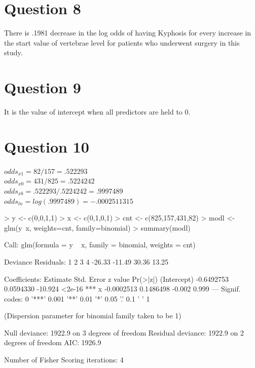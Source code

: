 \documentclass{article}
\begin{document}
\section*{Question 8}
There is .1981 decrease in the log odds of having Kyphosis for every increase in the start value of vertebrae level for patients who underwent surgery in this study. 

\section*{Question 9}
It is the value of intercept when all predictors are held to 0.

\section*{Question 10}
$ odds_{x1} = 82/157 = .522293$ ~\\
$ odds_{x0} = 431/825 = .5224242$ ~\\
$ odds_{xb} = .522293/.5224242 = .9997489$ ~\\
$ odds_{ln} = log(.9997489) =  -.0002511315$ ~\\

\begin{Schunk}
\begin{Sinput}
> y <- c(0,0,1,1)
> x <- c(0,1,0,1)
> cnt <- c(825,157,431,82)
> modl <- glm(y~x, weights=cnt, family=binomial)
> summary(modl)
\end{Sinput}
\begin{Soutput}
Call:
glm(formula = y ~ x, family = binomial, weights = cnt)

Deviance Residuals: 
     1       2       3       4  
-26.33  -11.49   30.36   13.25  

Coefficients:
              Estimate Std. Error z value Pr(>|z|)    
(Intercept) -0.6492753  0.0594330 -10.924   <2e-16 ***
x           -0.0002513  0.1486498  -0.002    0.999    
---
Signif. codes:  0 '***' 0.001 '**' 0.01 '*' 0.05 '.' 0.1 ' ' 1

(Dispersion parameter for binomial family taken to be 1)

    Null deviance: 1922.9  on 3  degrees of freedom
Residual deviance: 1922.9  on 2  degrees of freedom
AIC: 1926.9

Number of Fisher Scoring iterations: 4
\end{Soutput}
\end{Schunk}
\end{document}
